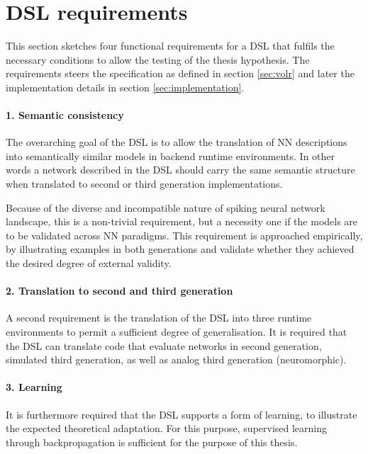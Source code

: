 \documentclass[report.tex]{subfiles}
\begin{document}
\section{DSL requirements} \label{sec:requirements}
This section sketches four functional requirements for a \gls{DSL} that 
fulfils the necessary conditions to allow the testing of the thesis hypothesis.
The requirements steers the specification as defined in section 
\ref{sec:volr} and later the implementation details in section
\ref{sec:implementation}.

\paragraph{1. Semantic consistency}
The overarching goal of the \gls{DSL} is to allow the translation 
of \gls{NN} descriptions into semantically similar models in backend runtime
environments.
In other words a network described in the \gls{DSL} should carry
the same semantic structure when translated to second or third generation
implementations. 

Because of the diverse and incompatible nature of spiking neural network
landscape, this is a non-trivial requirement,
but a necessity one if the models are to be validated across \gls{NN} paradigms.
This requirement is approached empirically, by illustrating examples in
both generations and validate whether they achieved the desired degree
of external validity.

\paragraph{2. Translation to second and third generation}
A second requirement is the translation of the \gls{DSL} into
three runtime environments to permit a sufficient degree of
generalisation.
It is required that the DSL can translate code that evaluate networks
in second generation, simulated third generation, as well as
analog third generation (neuromorphic).

\paragraph{3. Learning}
It is furthermore required that the \gls{DSL} supports a form of
learning, to illustrate the expected theoretical adaptation.
For this purpose, supervised learning through backpropagation
is sufficient for the purpose of this thesis.
\end{document}
